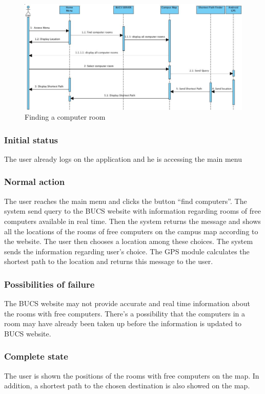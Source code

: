 \documentclass[10pt,a4paper,oneside]{report}
\begin{document}
\begin{figure}[H]
 \centering
 \includegraphics[keepaspectratio, scale=0.5]{seqcomp.png}
 \caption{Finding a computer room}
\end{figure}

\subsubsection*{Initial status}
The user already logs on the application and he is accessing the main menu
\subsubsection*{Normal action}
The user reaches the main menu and clicks the button “find computers”. The system send query to the BUCS website with information regarding rooms of free computers available in real time. Then the system returns the message and shows all the locations of the rooms of free computers on the campus map according to the website. The user then chooses a location among these choices. The system sends the information regarding user’s choice. The GPS module calculates the shortest path to the location and returns this message to the user.
\subsubsection*{Possibilities of failure}
The BUCS website may not provide accurate and real time information about the rooms with free computers. There’s a possibility that the computers in a room may have already been taken up before the information is updated to BUCS website.
\subsubsection*{Complete state}
The user is shown the positions of the rooms with free computers on the map. In addition, a shortest path to the chosen destination is also showed on the map.
\end{document}
